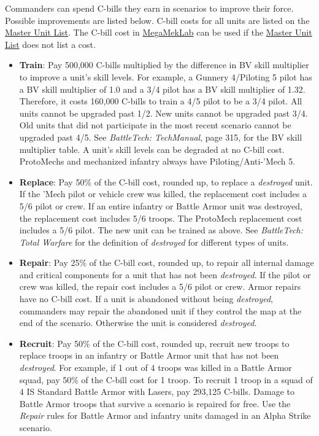 Commanders can spend C-bills they earn in scenarios to improve their force.
Possible improvements are listed below.
C-bill costs for all units are listed on the \href{http://www.masterunitlist.info}{Master Unit List}.
The C-bill cost in \href{https://megamek.org}{MegaMekLab} can be used if the \href{http://www.masterunitlist.info}{Master Unit List} does not list a cost.

\begin{itemize}

\item {\bfseries Train}: Pay 500,000 C-bills multiplied by the difference in BV skill multiplier to improve a unit's skill levels.
For example, a Gunnery 4/Piloting 5 pilot has a BV skill multiplier of 1.0 and a 3/4 pilot has a BV skill multiplier of 1.32.
Therefore, it costs 160,000 C-bills to train a 4/5 pilot to be a 3/4 pilot.
All units cannot be upgraded past 1/2.
New units cannot be upgraded past 3/4.
Old units that did not participate in the most recent scenario cannot be upgraded past 4/5.
See \emph{BattleTech: TechManual}, page 315, for the BV skill multiplier table.
A unit's skill levels can be degraded at no C-bill cost.
ProtoMechs and mechanized infantry always have Piloting/Anti-'Mech 5.

\item {\bfseries Replace}: Pay 50\% of the C-bill cost, rounded up, to replace a \emph{destroyed} unit.
If the 'Mech pilot or vehicle crew was killed, the replacement cost includes a 5/6 pilot or crew.
If an entire infantry or Battle Armor unit was destroyed, the replacement cost includes 5/6 troops.
The ProtoMech replacement cost includes a 5/6 pilot.
The new unit can be trained as above.
See \emph{BattleTech: Total Warfare} for the definition of \emph{destroyed} for different types of units.

\item {\bfseries Repair}: Pay 25\% of the C-bill cost, rounded up, to repair all internal damage and critical components for a unit that has not been \emph{destroyed}.
If the pilot or crew was killed, the repair cost includes a 5/6 pilot or crew.
Armor repairs have no C-bill cost.
If a unit is abandoned without being \emph{destroyed}, commanders may repair the abandoned unit if they control the map at the end of the scenario.
Otherwise the unit is considered \emph{destroyed}.

\item {\bfseries Recruit}: Pay 50\% of the C-bill cost, rounded up, recruit new troops to replace troops in an infantry or Battle Armor unit that has not been \emph{destroyed}.
For example, if 1 out of 4 troops was killed in a Battle Armor squad, pay 50\% of the C-bill cost for 1 troop.
To recruit 1 troop in a squad of 4 IS Standard Battle Armor with Lasers, pay 293,125 C-bills.
Damage to Battle Armor troops that survive a scenario is repaired for free.
Use the \emph{Repair} rules for Battle Armor and infantry units damaged in an Alpha Strike scenario.


\end{itemize}
